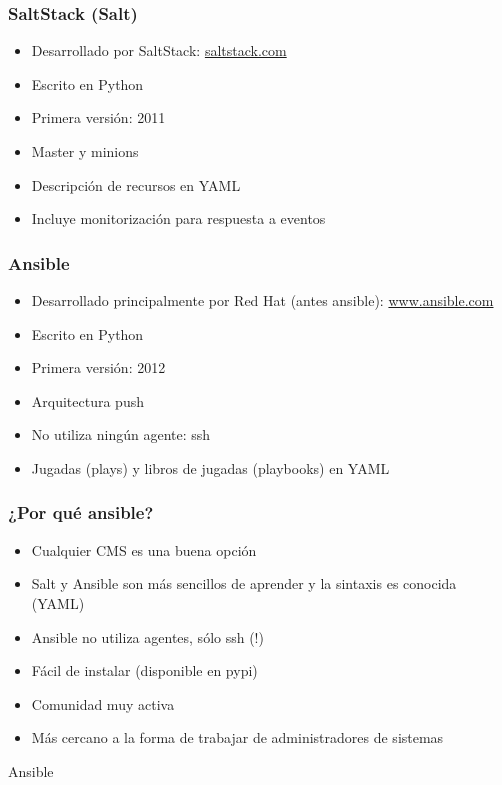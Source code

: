 \documentclass[aspectratio=169]{beamer}
\begin{document}
\begin{frame}
  \frametitle{SaltStack (Salt)}
  \begin{itemize}
  \item Desarrollado por SaltStack: \href{https://saltstack.com/}{saltstack.com}
  \item Escrito en Python
  \item Primera versión: 2011
  \item Master y minions
  \item Descripción de recursos en YAML
  \item Incluye monitorización para respuesta a eventos
  \end{itemize}
\end{frame}

\begin{frame}
  \frametitle{Ansible}
  \begin{itemize}
  \item Desarrollado principalmente por Red Hat (antes ansible): \href{https://www.ansible.com/}{www.ansible.com}
  \item Escrito en Python
  \item Primera versión: 2012
  \item Arquitectura push
  \item No utiliza ningún agente: ssh
  \item Jugadas (plays) y libros de jugadas (playbooks) en YAML
  \end{itemize}
\end{frame}

\begin{frame}
  \frametitle{¿Por qué ansible?}
  \begin{itemize}
  \item Cualquier CMS es una buena opción
  \item Salt y Ansible son más sencillos de aprender y la sintaxis es conocida (YAML)
  \item Ansible no utiliza agentes, sólo ssh (!)
  \item Fácil de instalar (disponible en pypi)
  \item Comunidad muy activa
  \item Más cercano a la forma de trabajar de administradores de sistemas
  \end{itemize}
\end{frame}

\begin{frame}
  \begin{Large}
    \begin{center}
      Ansible
    \end{center}
  \end{Large}
\end{frame}
\end{document}
